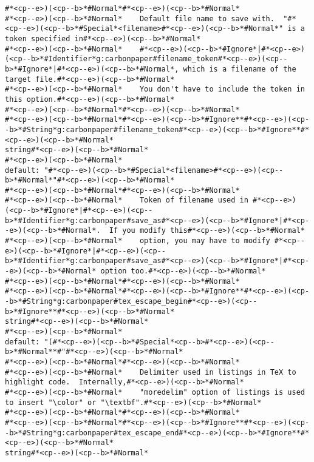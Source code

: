 \begin{lstlisting}[style=carbonpaper]
#*<cp--e>)(<cp--b>*#Normal*#*<cp--e>)(<cp--b>*#Normal*
#*<cp--e>)(<cp--b>*#Normal*    Default file name to save with.  "#*<cp--e>)(<cp--b>*#Special*<filename>#*<cp--e>)(<cp--b>*#Normal*" is a token specified in#*<cp--e>)(<cp--b>*#Normal*
#*<cp--e>)(<cp--b>*#Normal*    #*<cp--e>)(<cp--b>*#Ignore*|#*<cp--e>)(<cp--b>*#Identifier*g:carbonpaper#filename_token#*<cp--e>)(<cp--b>*#Ignore*|#*<cp--e>)(<cp--b>*#Normal*, which is a filename of the target file.#*<cp--e>)(<cp--b>*#Normal*
#*<cp--e>)(<cp--b>*#Normal*    You don't have to include the token in this option.#*<cp--e>)(<cp--b>*#Normal*
#*<cp--e>)(<cp--b>*#Normal*#*<cp--e>)(<cp--b>*#Normal*
#*<cp--e>)(<cp--b>*#Normal*#*<cp--e>)(<cp--b>*#Ignore**#*<cp--e>)(<cp--b>*#String*g:carbonpaper#filename_token#*<cp--e>)(<cp--b>*#Ignore**#*<cp--e>)(<cp--b>*#Normal*                                          string#*<cp--e>)(<cp--b>*#Normal*
#*<cp--e>)(<cp--b>*#Normal*                                                       default: "#*<cp--e>)(<cp--b>*#Special*<filename>#*<cp--e>)(<cp--b>*#Normal*"#*<cp--e>)(<cp--b>*#Normal*
#*<cp--e>)(<cp--b>*#Normal*#*<cp--e>)(<cp--b>*#Normal*
#*<cp--e>)(<cp--b>*#Normal*    Token of filename used in #*<cp--e>)(<cp--b>*#Ignore*|#*<cp--e>)(<cp--b>*#Identifier*g:carbonpaper#save_as#*<cp--e>)(<cp--b>*#Ignore*|#*<cp--e>)(<cp--b>*#Normal*.  If you modify this#*<cp--e>)(<cp--b>*#Normal*
#*<cp--e>)(<cp--b>*#Normal*    option, you may have to modify #*<cp--e>)(<cp--b>*#Ignore*|#*<cp--e>)(<cp--b>*#Identifier*g:carbonpaper#save_as#*<cp--e>)(<cp--b>*#Ignore*|#*<cp--e>)(<cp--b>*#Normal* option too.#*<cp--e>)(<cp--b>*#Normal*
#*<cp--e>)(<cp--b>*#Normal*#*<cp--e>)(<cp--b>*#Normal*
#*<cp--e>)(<cp--b>*#Normal*#*<cp--e>)(<cp--b>*#Ignore**#*<cp--e>)(<cp--b>*#String*g:carbonpaper#tex_escape_begin#*<cp--e>)(<cp--b>*#Ignore**#*<cp--e>)(<cp--b>*#Normal*                                        string#*<cp--e>)(<cp--b>*#Normal*
#*<cp--e>)(<cp--b>*#Normal*                                                       default: "(#*<cp--e>)(<cp--b>*#Special*<cp--b>#*<cp--e>)(<cp--b>*#Normal**#"#*<cp--e>)(<cp--b>*#Normal*
#*<cp--e>)(<cp--b>*#Normal*#*<cp--e>)(<cp--b>*#Normal*
#*<cp--e>)(<cp--b>*#Normal*    Delimiter used in listings in TeX to highlight code.  Internally,#*<cp--e>)(<cp--b>*#Normal*
#*<cp--e>)(<cp--b>*#Normal*    "moredelim" option of listings is used to insert "\color" or "\textbf".#*<cp--e>)(<cp--b>*#Normal*
#*<cp--e>)(<cp--b>*#Normal*#*<cp--e>)(<cp--b>*#Normal*
#*<cp--e>)(<cp--b>*#Normal*#*<cp--e>)(<cp--b>*#Ignore**#*<cp--e>)(<cp--b>*#String*g:carbonpaper#tex_escape_end#*<cp--e>)(<cp--b>*#Ignore**#*<cp--e>)(<cp--b>*#Normal*                                          string#*<cp--e>)(<cp--b>*#Normal*

\end{lstlisting}
